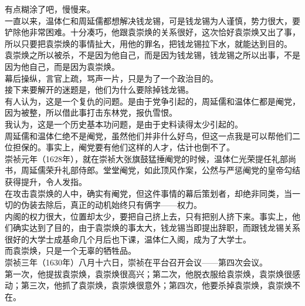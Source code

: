 \begin{multicols}{\theparacolNo}
有点糊涂了吧，慢慢来。\\

一直以来，温体仁和周延儒都想解决钱龙锡，可是钱龙锡为人谨慎，势力很大，要铲除他非常困难。十分凑巧，他跟袁崇焕的关系很好，这次恰好袁崇焕又出了事，所以只要把袁崇焕的事情扯大，用他的罪名，把钱龙锡拉下水，就能达到目的。\\

袁崇焕之所以被杀，不是因为他自己，而是因为钱龙锡，钱龙锡之所以出事，不是因为他自己，而是因为袁崇焕。\\

幕后操纵，言官上疏，骂声一片，只是为了一个政治目的。\\

接下来要解开的迷题是，他们为什么要除掉钱龙锡。\\

有人认为，这是一个复仇的问题。是由于党争引起的，周延儒和温体仁都是阉党，因为被整，所以借此事打击东林党，报仇雪恨。\\

我认为，这是一个历史基本功问题，是由于史料读得太少引起的。\\

周延儒和温体仁绝不是阉党，虽然他们并非什么好鸟，但这一点我是可以帮他们二位担保的。事实上，阉党要有他们这样的人才，估计也倒不了。\\

崇祯元年（1628年），就在崇祯大张旗鼓猛捶阉党的时候，温体仁光荣提任礼部尚书，周延儒荣升礼部侍郎。堂堂阉党，如此顶风作案，公然与严惩阉党的皇帝勾结获得提升，令人发指。\\

在攻击袁崇焕的人中，确实有阉党，但这件事情的幕后策划者，却绝非同类，当一切的伪装去除后，真正的动机始终只有俩字——权力。\\

内阁的权力很大，位置却太少，要把自己挤上去，只有把别人挤下来。事实上，他们确实达到了目的，由于袁崇焕的事太大，钱龙锡当即提出辞职，而跟钱龙锡关系很好的大学士成基命几个月后也下课，温体仁入阁，成为了大学士。\\

而袁崇焕，只是一个无辜的牺牲品。\\

崇祯三年（1630年）八月十六日，崇祯在平台召开会议——第四次会议。\\

第一次，他提拔袁崇焕，袁崇焕很高兴；第二次，他脱衣服给袁崇焕，袁崇焕很感动；第三次，他抓了袁崇焕，袁崇焕很意外；第四次，他要杀掉袁崇焕，袁崇焕不在。\\


\end{multicols}
